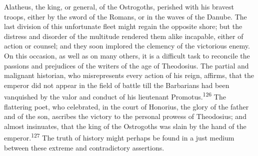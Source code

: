 Alatheus, the king, or general, of the Ostrogoths, perished with
his bravest troops, either by the sword of the Romans, or in the
waves of the Danube. The last division of this unfortunate fleet
might regain the opposite shore; but the distress and disorder of
the multitude rendered them alike incapable, either of action or
counsel; and they soon implored the clemency of the victorious
enemy. On this occasion, as well as on many others, it is a
difficult task to reconcile the passions and prejudices of the
writers of the age of Theodosius. The partial and malignant
historian, who misrepresents every action of his reign, affirms,
that the emperor did not appear in the field of battle till the
Barbarians had been vanquished by the valor and conduct of his
lieutenant Promotus.\textsuperscript{126} The flattering poet, who celebrated, in
the court of Honorius, the glory of the father and of the son,
ascribes the victory to the personal prowess of Theodosius; and
almost insinuates, that the king of the Ostrogoths was slain by
the hand of the emperor.\textsuperscript{127} The truth of history might perhaps
be found in a just medium between these extreme and contradictory
assertions.






